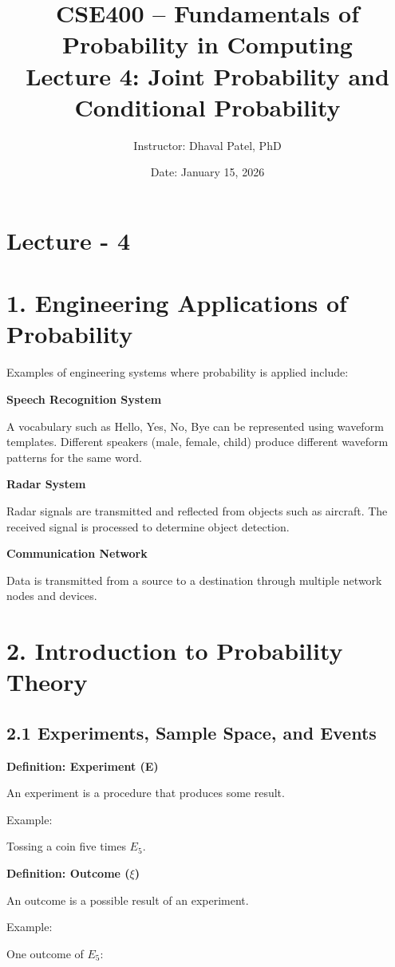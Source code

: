 \documentclass[12pt]{article}
\title{CSE400 – Fundamentals of Probability in Computing\\
Lecture 4: Joint Probability and Conditional Probability}
\author{Instructor: Dhaval Patel, PhD}
\date{Date: January 15, 2026}
\begin{document}
\maketitle

\section*{Lecture - 4}

\section*{1. Engineering Applications of Probability}

Examples of engineering systems where probability is applied include:

\textbf{Speech Recognition System}

A vocabulary such as Hello, Yes, No, Bye can be represented using waveform templates. Different speakers (male, female, child) produce different waveform patterns for the same word.

\textbf{Radar System}

Radar signals are transmitted and reflected from objects such as aircraft. The received signal is processed to determine object detection.

\textbf{Communication Network}

Data is transmitted from a source to a destination through multiple network nodes and devices.

\section*{2. Introduction to Probability Theory}

\subsection*{2.1 Experiments, Sample Space, and Events}

\textbf{Definition: Experiment (E)}

An experiment is a procedure that produces some result.

Example:

Tossing a coin five times $E_5$.

\textbf{Definition: Outcome ($\xi$)}

An outcome is a possible result of an experiment.

Example:

One outcome of $E_5$:
\end{document}
